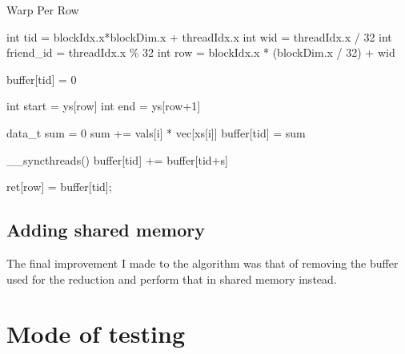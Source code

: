 \documentclass{article}
\begin{document}
\begin{algorithm}[ht]
    \caption{Warp Per Row}
    int tid = blockIdx.x*blockDim.x + threadIdx.x\;
    int wid = threadIdx.x / 32\;
    int friend\_id = threadIdx.x \% 32 
    int row = blockIdx.x * (blockDim.x / 32) + wid\;

    buffer[tid] = 0 
     {
        int start = ys[row]\;
        int end = ys[row+1]\;

        data\_t sum = 0\;
         {
            sum += vals[i] * vec[xs[i]]\;
        }
        buffer[tid] = sum\;
    }

     {
        \_\_syncthreads() 
         {
            buffer[tid] += buffer[tid+s]\;
        }
    }

     {
        ret[row] = buffer[tid];
    }
\end{algorithm}

\subsection{Adding shared memory}
The final improvement I made to the algorithm was that of removing the buffer used for the reduction and perform that in shared memory instead.


\section{Mode of testing}
\end{document}
